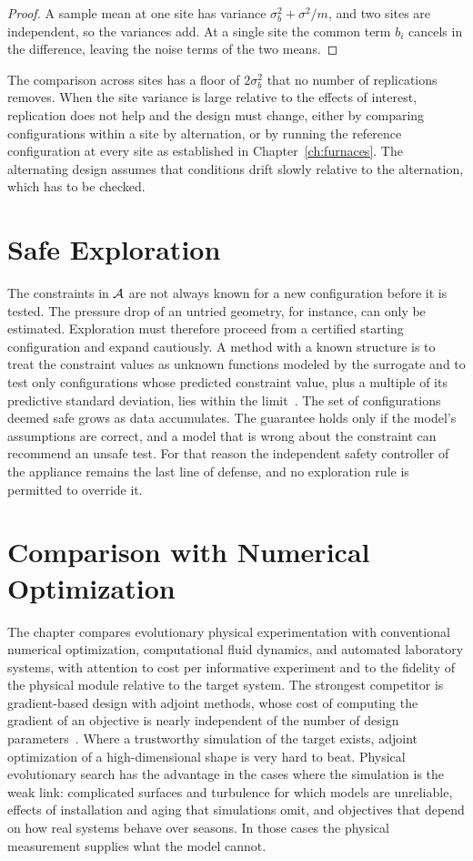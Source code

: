 \begin{proof}
A sample mean at one site has variance $\sigma_b^{2}+\sigma^{2}/m$, and two sites are independent, so the variances add. At a single site the common term $b_i$ cancels in the difference, leaving the noise terms of the two means.
\end{proof}

The comparison across sites has a floor of $2\sigma_b^{2}$ that no number of replications removes. When the site variance is large relative to the effects of interest, replication does not help and the design must change, either by comparing configurations within a site by alternation, or by running the reference configuration at every site as established in Chapter~\ref{ch:furnaces}. The alternating design assumes that conditions drift slowly relative to the alternation, which has to be checked.

\section{Safe Exploration}

The constraints in $\mathcal{A}$ are not always known for a new configuration before it is tested. The pressure drop of an untried geometry, for instance, can only be estimated. Exploration must therefore proceed from a certified starting configuration and expand cautiously. A method with a known structure is to treat the constraint values as unknown functions modeled by the surrogate and to test only configurations whose predicted constraint value, plus a multiple of its predictive standard deviation, lies within the limit~\cite{sui2015}. The set of configurations deemed safe grows as data accumulates. The guarantee holds only if the model's assumptions are correct, and a model that is wrong about the constraint can recommend an unsafe test. For that reason the independent safety controller of the appliance remains the last line of defense, and no exploration rule is permitted to override it.

\section{Comparison with Numerical Optimization}

The chapter compares evolutionary physical experimentation with conventional numerical optimization, computational fluid dynamics, and automated laboratory systems, with attention to cost per informative experiment and to the fidelity of the physical module relative to the target system. The strongest competitor is gradient-based design with adjoint methods, whose cost of computing the gradient of an objective is nearly independent of the number of design parameters~\cite{jameson1988}. Where a trustworthy simulation of the target exists, adjoint optimization of a high-dimensional shape is very hard to beat. Physical evolutionary search has the advantage in the cases where the simulation is the weak link: complicated surfaces and turbulence for which models are unreliable, effects of installation and aging that simulations omit, and objectives that depend on how real systems behave over seasons. In those cases the physical measurement supplies what the model cannot.

